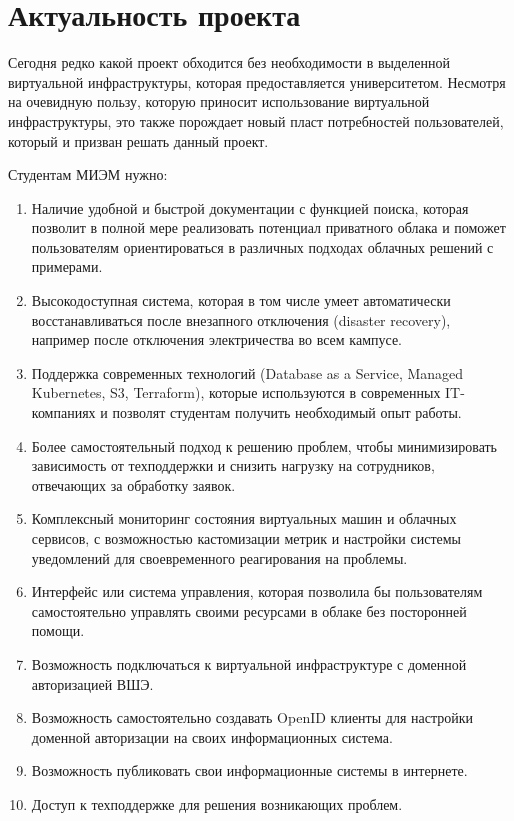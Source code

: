 \documentclass[14pt, a4paper]{extarticle}
\begin{document}

\tableofcontents

\pagebreak


\section{Актуальность проекта}

Сегодня редко какой проект обходится без необходимости в выделенной виртуальной
инфраструктуры, которая предоставляется университетом. Несмотря на очевидную
пользу, которую приносит использование виртуальной инфраструктуры, это также
порождает новый пласт потребностей пользователей, который и призван решать
данный проект.

Студентам МИЭМ нужно:

\begin{enumerate}

\item Наличие удобной и быстрой документации с функцией поиска, которая позволит в полной мере реализовать потенциал приватного облака и поможет пользователям ориентироваться в различных подходах облачных решений с примерами.
\item Высокодоступная система, которая в том числе умеет автоматически восстанавливаться после внезапного отключения (disaster recovery), например после отключения электричества во всем кампусе.
\item Поддержка современных технологий (Database as a Service, Managed Kubernetes, S3, Terraform), которые используются в современных IT-компаниях и позволят студентам получить необходимый опыт работы.
\item Более самостоятельный подход к решению проблем, чтобы минимизировать зависимость от техподдержки и снизить нагрузку на сотрудников, отвечающих за обработку заявок.
\item Комплексный мониторинг состояния виртуальных машин и облачных сервисов, с возможностью кастомизации метрик и настройки системы уведомлений для своевременного реагирования на проблемы.
\item Интерфейс или система управления, которая позволила бы пользователям самостоятельно управлять своими ресурсами в облаке без посторонней помощи.
\item Возможность подключаться к виртуальной инфраструктуре с доменной авторизацией ВШЭ.
\item Возможность самостоятельно создавать OpenID клиенты для настройки доменной авторизации на своих информационных система.
\item Возможность публиковать свои информационные системы в интернете.
\item Доступ к техподдержке для решения возникающих проблем.

\end{enumerate}
\end{document}
